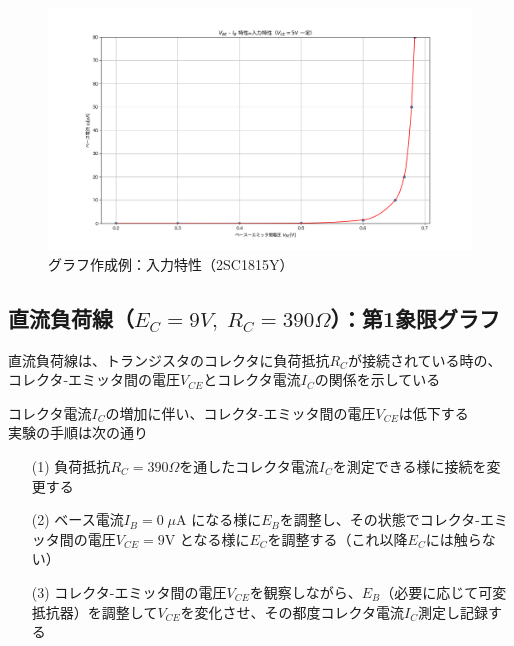 \documentclass[uplatex,a4paper,11pt,oneside,openany]{jsbook}
\begin{document}
\vfill

\newpage

\begin{figure}[H]
  \centering
   \includegraphics[keepaspectratio, scale=0.45, angle=0]
               {figs/png/x3static.png}
               \caption{グラフ作成例：入力特性（2SC1815Y）}
               \label{fig:iocharM1Yd}
\end{figure}

\newpage

\subsection{直流負荷線（$E_C=9V,\;R_C=390\Omega$）：第1象限グラフ}

直流負荷線は、トランジスタのコレクタに負荷抵抗$R_C$が接続されている時の、
コレクタ-エミッタ間の電圧$V_{CE}$とコレクタ電流$I_C$の関係を示している

コレクタ電流$I_C$の増加に伴い、コレクタ-エミッタ間の電圧$V_{CE}$は低下する\\

実験の手順は次の通り

\begin{enumerate}
\item[(1)] 負荷抵抗$R_C=390\Omega$を通したコレクタ電流$I_C$を測定できる様に接続を変更する
\item[(2)] ベース電流$I_B=0\;\mu$A になる様に$E_B$を調整し、その状態でコレクタ-エミッタ間の電圧$V_{CE}=9$V となる様に$E_C$を調整する（これ以降$E_C$には触らない）
\item[(3)] コレクタ-エミッタ間の電圧$V_{CE}$を観察しながら、$E_B$（必要に応じて可変抵抗器）を調整して$V_{CE}$を変化させ、その都度コレクタ電流$I_C$測定し記録する  
\end{enumerate}
\end{document}
